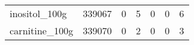 \begin{tabular}{lrrrrrr}
inositol\_100g                              &                                        339067 &                                         0 &                                             5 &                                         0 &                      0 &                6 \\
carnitine\_100g                             &                                        339070 &                                         0 &                                             2 &                                         0 &                      0 &                3 \\
\bottomrule
\end{tabular}
